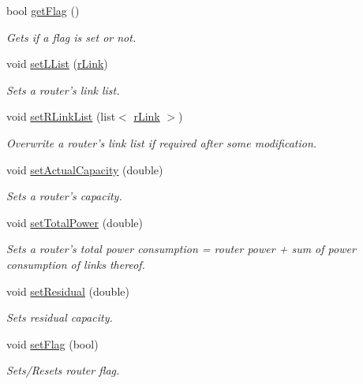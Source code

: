 \begin{DoxyCompactItemize}
bool \hyperlink{classrouter_aaa3d78b2556a095f725d5a2202265d55}{get\-Flag} ()
\begin{DoxyCompactList}\small\item\em \-Gets if a flag is set or not. \end{DoxyCompactList}\item 
void \hyperlink{classrouter_a20f58c16edd3ca8d8afb73cf9f27f549}{set\-L\-List} (\hyperlink{classrLink}{r\-Link})
\begin{DoxyCompactList}\small\item\em \-Sets a router's link list. \end{DoxyCompactList}\item 
void \hyperlink{classrouter_a28908a05b7e50a0ab45481c94c8042a8}{set\-R\-Link\-List} (list$<$ \hyperlink{classrLink}{r\-Link} $>$)
\begin{DoxyCompactList}\small\item\em \-Overwrite a router's link list if required after some modification. \end{DoxyCompactList}\item 
void \hyperlink{classrouter_a90c5339e7bed5597f06be903305ef588}{set\-Actual\-Capacity} (double)
\begin{DoxyCompactList}\small\item\em \-Sets a router's capacity. \end{DoxyCompactList}\item 
void \hyperlink{classrouter_a9b06f4e341fea7bf5a853b0a2caf1d2a}{set\-Total\-Power} (double)
\begin{DoxyCompactList}\small\item\em \-Sets a router's total power consumption = router power + sum of power consumption of links thereof. \end{DoxyCompactList}\item 
void \hyperlink{classrouter_ac839466bae2c42cee73a33b4d185f48a}{set\-Residual} (double)
\begin{DoxyCompactList}\small\item\em \-Sets residual capacity. \end{DoxyCompactList}\item 
void \hyperlink{classrouter_ab4e2af9a6d0412fa8d3e6cea8b411f7c}{set\-Flag} (bool)
\begin{DoxyCompactList}\small\item\em \-Sets/\-Resets router flag. \end{DoxyCompactList}\end{DoxyCompactItemize}


